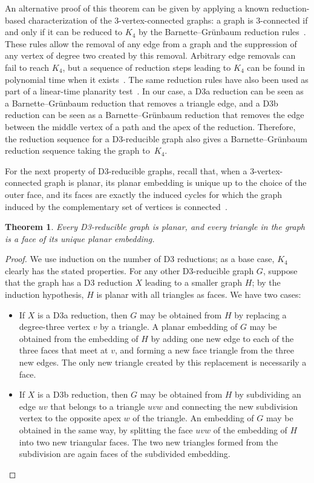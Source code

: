 \documentclass{article}
\newtheorem{theorem}{Theorem}
\begin{document}
An alternative proof of this theorem can be given by applying a known reduction-based characterization of the 3-vertex-connected graphs: a graph is 3-connected if and only if it can be reduced to $K_4$ by the Barnette--Gr\"unbaum reduction rules~\cite[Thm.~1]{BarGru-MFGT-69}. These rules allow the removal of any edge from a graph and the suppression of any vertex of degree two created by this removal. Arbitrary edge removals can fail to reach $K_4$, but a sequence of reduction steps leading to $K_4$ can be found in polynomial time when it exists~\cite{Sch-Algo-12}. The same reduction rules have also been used as part of a linear-time planarity test~\cite{Sch-MFCS-13}. In our case, a D3a reduction can be seen as a Barnette--Gr\"unbaum reduction that removes a triangle edge, and a D3b reduction can be seen as a Barnette--Gr\"unbaum reduction that removes the edge between the middle vertex of a path and the apex of the reduction. Therefore, the reduction sequence for a D3-reducible graph also gives a Barnette--Gr\"unbaum reduction sequence taking the graph to~$K_4$.

For the next property of D3-reducible graphs, recall that, when a 3-vertex-connected graph is planar, its planar embedding is unique up to the choice of the outer face, and its faces are exactly the induced cycles for which the graph induced by the complementary set of vertices is connected~\cite{Bru-JCTB-04}.

\begin{theorem}
Every D3-reducible graph is planar, and every triangle in the graph is a face of its unique planar embedding.
\end{theorem}

\begin{proof}
We use induction on the number of D3 reductions; as a base case, $K_4$ clearly has the stated properties. For any other D3-reducible graph $G$, suppose that the graph has a D3 reduction $X$ leading to a smaller graph $H$; by the induction hypothesis, $H$ is planar with all triangles as faces. We have two cases:
\begin{itemize}
\item If $X$ is a D3a reduction, then $G$ may be obtained from $H$ by replacing a degree-three vertex $v$ by a triangle. A planar embedding of $G$ may be obtained from the embedding of $H$ by adding one new edge to each of the three faces that meet at $v$, and forming a new face triangle from the three new edges. The only new triangle created by this replacement is necessarily a face.
\item If $X$ is a D3b reduction, then $G$ may be obtained from $H$ by subdividing an edge $uv$ that belongs to a triangle $uvw$ and connecting the new subdivision vertex to the opposite apex $w$ of the triangle. An embedding of $G$ may be obtained in the same way, by splitting the face $uvw$ of the embedding of $H$ into two new triangular faces. The two new triangles formed from the subdivision are again faces of the subdivided embedding.\qedhere
\end{itemize}
\end{proof}
\end{document}

